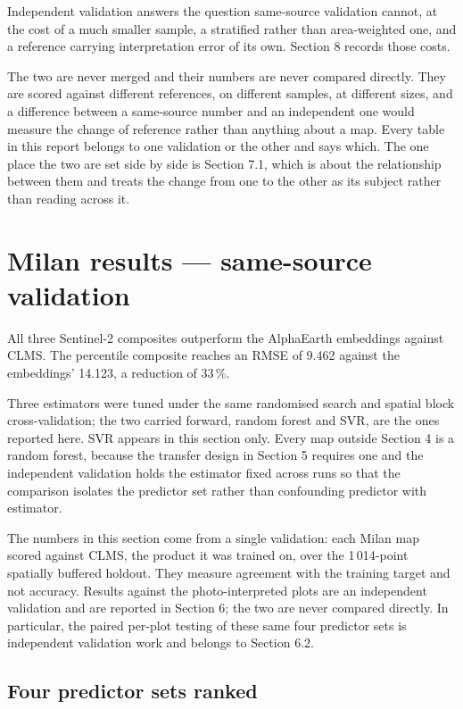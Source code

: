 \documentclass[11pt,a4paper]{article}
\begin{document}
Independent validation answers the question same-source validation cannot, at
the cost of a much smaller sample, a stratified rather than area-weighted one,
and a reference carrying interpretation error of its own. Section 8 records
those costs.

The two are never merged and their numbers are never compared directly. They
are scored against different references, on different samples, at different
sizes, and a difference between a same-source number and an independent one
would measure the change of reference rather than anything about a map. Every
table in this report belongs to one validation or the other and says which. The
one place the two are set side by side is Section 7.1, which is about the
relationship between them and treats the change from one to the other as its
subject rather than reading across it.

\section{Milan results --- same-source validation}

All three Sentinel-2 composites outperform the AlphaEarth embeddings against
CLMS. The percentile composite reaches an RMSE of 9.462 against the embeddings'
14.123, a reduction of 33\,\%.

Three estimators were tuned under the same randomised search and spatial block
cross-validation; the two carried forward, random forest and SVR, are the ones
reported here. SVR appears in this section only. Every map outside Section 4 is
a random forest, because the transfer design in Section 5 requires one and the
independent validation holds the estimator fixed across runs so that the
comparison isolates the predictor set rather than confounding predictor with
estimator.

The numbers in this section come from a single validation: each Milan map scored
against CLMS, the product it was trained on, over the 1\,014-point spatially
buffered holdout. They measure agreement with the training target and not
accuracy. Results against the photo-interpreted plots are an independent
validation and are reported in Section 6; the two are never compared directly.
In particular, the paired per-plot testing of these same four predictor sets is
independent validation work and belongs to Section 6.2.

\subsection{Four predictor sets ranked}
\end{document}
